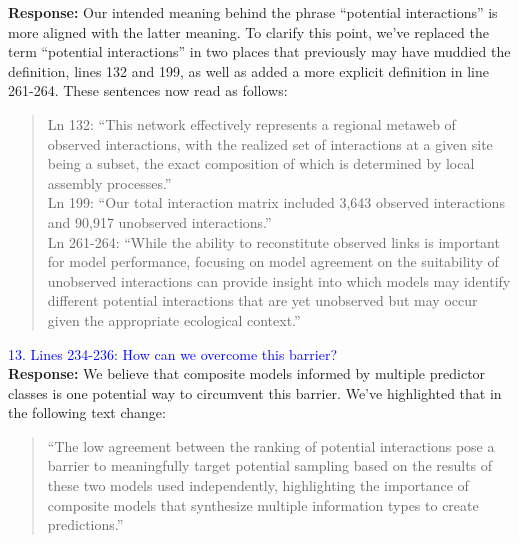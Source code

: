 \documentclass{article}
\begin{document}
\textbf{Response:} Our intended meaning behind the phrase “potential interactions” is more aligned with the latter meaning. To clarify this point, we’ve replaced the term “potential interactions” in two places that previously may have muddied the definition, lines 132 and 199, as well as added a more explicit definition in line 261-264. These sentences now read as follows:
\begin{quote}
Ln 132: “This network effectively represents a regional metaweb of observed interactions, with the realized set of interactions at a given site being a subset, the exact composition of which is determined by local assembly processes.”\\
Ln 199: “Our total interaction matrix included 3,643 observed interactions and 90,917 unobserved interactions.”\\
Ln 261-264: “While the ability to reconstitute observed links is important for model performance, focusing on model agreement on the suitability of unobserved interactions can provide insight into which models may identify different potential interactions that are yet unobserved but may occur given the appropriate ecological context.”
\end{quote}

\textcolor{blue}{13. Lines 234-236: How can we overcome this barrier?} \\
\textbf{Response:} We believe that composite models informed by multiple predictor classes is one potential way to circumvent this barrier. We’ve highlighted that in the following text change: 
\begin{quote}
“The low agreement between the ranking of potential interactions pose a barrier to meaningfully target potential sampling based on the results of these two models used independently, highlighting the importance of composite models that synthesize multiple information types to create predictions.”
\end{quote}
\end{document}
